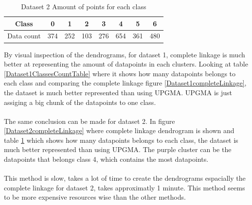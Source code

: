 \documentclass[12pt]{report}
\begin{document}
	\begin{table}[H]
		\centering
		\begin{tabular}{|c|c|c|c|c|c|c|c|}
			\hline
			Class & 0 & 1 & 2 & 3 & 4 & 5 & 6 \\
			\hline
			Data count & 374 & 252 & 103 & 276 & 654 & 361 & 480 \\
			\hline
		\end{tabular}
		\caption{Dataset 2 Amount of points for each class}
		\label{Dataset2ClassesCountTable}
	\end{table}

	By visual inspection of the dendrograms, for dataset 1, complete linkage is much better at representing the amount of datapoints in each clusters. Looking at table \ref{Dataset1ClassesCountTable} where it shows how many datapoints belongs to each class and comparing the complete linkage figure \ref{Dataset1completeLinkage}, the dataset is much better represented than using UPGMA. UPGMA is just assiging a big chunk of the datapoints to one class.\\
	\\
	The same conclusion can be made for dataset 2. In figure \ref{Dataset2completeLinkage} where complete linkage dendrogram is shown and table \ref{Dataset2ClassesCountTable} which shows how many datapoints belongs to each class, the dataset is much better represented than using UPGMA. The purple cluster can be the datapoints that belongs class 4, which contains the most datapoints.\\
	\\
	This method is slow, takes a lot of time to create the dendrograms espacially the complete linkage for dataset 2, takes approximatly 1 minute. This method seems to be more expensive resources wise than the other methods.
\end{document}
